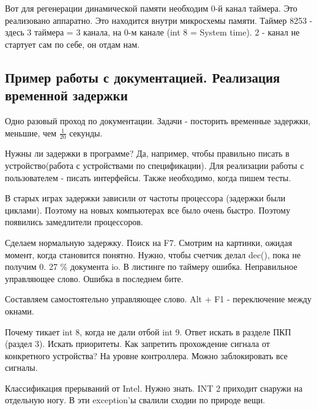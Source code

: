 Вот для регенерации динамической памяти необходим 0-й канал таймера. Это реализовано аппаратно. Это находится внутри микросхемы памяти. Таймер 8253 - здесь 3 таймера = 3 канала, на 0-м канале (int 8 = System time). 2 - канал не стартует сам по себе, он отдам нам. 
\subsection{Пример работы с документацией. Реализация временной задержки}
Одно разовый проход по документации. Задачи - посторить временные задержки, меньшие, чем $\frac{1}{20}$ секунды. 

Нужны ли задержки в программе? Да, например, чтобы правильно писать в устройство(работа с устройствами по спецификации). Для реализации работы с пользователем - писать интерфейсы. Также необходимо, когда пишем тесты. 

В старых играх задержки зависили от частоты процессора (задержки были циклами). Поэтому на новых компьютерах все было очень быстро. Поэтому появились замедлители процессоров. 

Сделаем нормальную задержку. Поиск на F7. Смотрим на картинки, ожидая момент, когда становится понятно. Нужно, чтобы счетчик делал dec(), пока не получим 0. 27 \% документа io.  В листинге по таймеру ошибка. Неправильное управляющее слово.  Ошибка в последнем бите. 

Составляем самостоятельно управляющее слово. Alt + F1 - переключение между окнами.

\begin{hw}Почему тикает int 8, когда не дали отбой int 9. Ответ искать в разделе ПКП (раздел 3). Искать приоритеты. Как запретить прохождение сигнала от конкретного устройства? На уровне контроллера. Можно заблокировать все сигналы.\end{hw}

\begin{hw}Классификация прерываний от Intel. Нужно знать. INT 2 приходит снаружи на отдельную ногу. В эти exception'ы свалили сходии по природе вещи.\end{hw} 